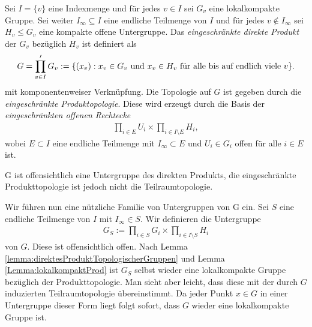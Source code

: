 		\begin{defi}
			Sei $I=\{v\}$ eine Indexmenge und für jedes $v \in I$ sei $G_v$ eine lokalkompakte Gruppe. 
			Sei weiter $I_\infty \subseteq I$ eine endliche Teilmenge von $I$ und für jedes $v \notin I_\infty$ sei $H_v\leq G_v$ eine kompakte offene Untergruppe. 
			Das \emph{eingeschränkte direkte Produkt} der $G_v$ bezüglich $H_v$ ist definiert als 
			\begin{align*}
				G = \prod\limits_{v \in I}' G_v := \{ (x_v): x_v \in G_v \text{ und } x_v \in H_v \text{ für alle bis auf endlich viele } v \}.
			\end{align*}
			mit komponentenweiser Verknüpfung. Die Topologie auf $G$ ist gegeben durch die \emph{eingeschränkte Produktopologie}. 
			Diese wird erzeugt durch die Basis der \emph{eingeschränkten offenen Rechtecke}
			\begin{align*}
				\prod_{i \in E} U_i \times \prod_{i \in I\setminus E} H_i,
			\end{align*}
			wobei $E \subset I$ eine endliche Teilmenge mit $I_\infty \subset E$ und $U_i \in G_i$ offen für alle $i \in E$ ist.
		\end{defi}
		G ist offensichtlich eine Untergruppe des direkten Produkts, die eingeschränkte Produkttopologie ist jedoch nicht die Teilraumtopologie.
		
		Wir führen nun eine nützliche Familie von Untergruppen von G ein. Sei $S$ eine endliche Teilmenge von $I$ mit $I_\infty \in S$. Wir definieren die Untergruppe
		\begin{align*}
			G_S := \prod_{i \in S}G_i \times \prod_{i \in I\setminus S} H_i
		\end{align*}
		von $G$. Diese ist offensichtlich offen. 
		Nach Lemma \ref{lemma:direktesProduktTopologischerGruppen} und Lemma \ref{Lemma:lokalkompaktProd} ist $G_S$ selbst wieder eine lokalkompakte Gruppe bezüglich der Produkttopologie.
		Man sieht aber leicht, dass diese mit der durch $G$ induzierten Teilraumtopologie übereinstimmt.
		Da jeder Punkt $x \in G$ in einer Untergruppe dieser Form liegt folgt sofort, dass $G$ wieder eine lokalkompakte Gruppe ist.
		

